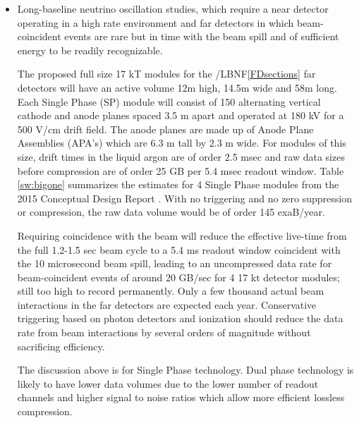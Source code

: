 \begin{itemize}
\item Long-baseline neutrino oscillation studies, which require a near detector operating in a high rate environment and far detectors in which beam-coincident events are rare but in time with the beam spill and of sufficient energy to be readily recognizable.  

The proposed  full size 17 kT modules for the  /LBNF\ref{FDsections} far detectors will  have an active volume 12m high, 14.5m wide and 58m long.  Each Single Phase (SP) module will consist of
150 alternating vertical cathode and anode planes  spaced 3.5 m apart and operated at 180 kV for a 500 V/cm drift field.  The anode planes are made up of Anode Plane Assemblies  (APA's) which are 6.3 m tall by 2.3 m wide. %
For modules of this size, drift times in the liquid argon are of order 2.5 msec and raw data sizes before compression are of order 25 GB per 5.4 msec readout window. Table \ref{sw:bigone} summarizes the estimates for 4 Single Phase modules from the 2015 Conceptual Design Report \cite{cdr-annex-rates}.  With no triggering and no zero suppression or compression, the raw data volume would be of order 145 exaB/year. 

Requiring  coincidence with the  beam will reduce the effective live-time from the full 1.2-1.5 sec beam cycle to a 5.4 ms readout window coincident with the 10 microsecond beam spill, leading to an uncompressed data rate for beam-coincident events of around 20 GB/sec for 4 17 kt detector modules;  still too high to record permanently.
Only a few thousand actual beam interactions in the far detectors are expected each year.  Conservative triggering based on photon detectors and ionization should reduce the data rate from beam interactions by several orders of magnitude without sacrificing efficiency.

The discussion above is for Single Phase technology. Dual phase technology is likely to have lower data volumes due to the lower number of readout channels and higher signal to noise ratios which allow more efficient  lossless compression.





\end{itemize}
